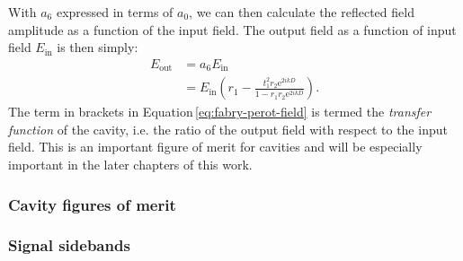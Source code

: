 With $a_6$ expressed in terms of $a_0$, we can then calculate the reflected field amplitude as a function of the input field. The output field as a function of input field $E_{\text{in}}$ is then simply:
\begin{equation}
  \label{eq:fabry-perot-field}
  \begin{split}
    E_{\text{out}} &= a_6 E_{\text{in}} \\
                   &= E_{\text{in}} \left( r_1 - \frac{t_1^2 r_2 \text{e}^{2ikD}}{1 - r_1 r_2 \text{e}^{2ikD}} \right).
  \end{split}
\end{equation}
The term in brackets in Equation\,\ref{eq:fabry-perot-field} is termed the \emph{transfer function} of the cavity, i.e. the ratio of the output field with respect to the input field. This is an important figure of merit for cavities and will be especially important in the later chapters of this work.

\subsubsection{Cavity figures of merit}

\subsubsection{Signal sidebands}

